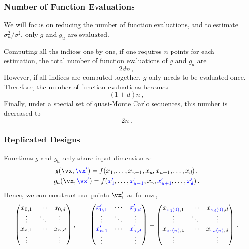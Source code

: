 \documentclass[11pt,compress]{beamer} %
\begin{document}
\begin{frame}
\frametitle{Number of Function Evaluations}
We will focus on reducing the number of function evaluations, and to estimate $\sigma_u^2/\sigma^2$, only $g$ and $g_u$ are evaluated.

Computing all the indices one by one, if one requires $n$ points for each estimation, the total number of function evaluations of $g$ and $g_u$ are
\[
2dn\, ,
\]
However, if all indices are computed together, $g$ only needs to be evaluated once. Therefore, the number of function evaluations becomes
\[
(1+d)n\, ,
\]
Finally, under a special set of quasi-Monte Carlo sequences, this number is decreased to
\[
2n\, .
\]
\end{frame}

\begin{frame}
\frametitle{Replicated Designs}
Functions $g$ and $g_u$ only share input dimension $u$:
\begin{gather*}
g(\vx,{\color{blue}\vx'})=f(x_1,\dots,x_{u-1},x_u,x_{u+1},\dots,x_d)\, ,\\
g_u(\vx,{\color{blue}\vx'})=f({\color{blue}x'_1},\dots,{\color{blue}x'_{u-1}},x_u,{\color{blue}x'_{u+1}},\dots,{\color{blue}x'_d})\, .
\end{gather*}
Hence, we can construct our points $\vx'_i$ as follows,
\begin{equation*}
\begin{pmatrix}
x_{0,1} & \cdots & x_{0,d} \\
\vdots & \ddots & \vdots \\
x_{n,1} & \cdots & x_{n,d} \\
\vdots &  & \vdots
\end{pmatrix},\qquad
\begin{pmatrix}
{\color{blue}x'_{0,1}} & \cdots & {\color{blue}x'_{0,d}} \\
\vdots & \ddots & \vdots \\
{\color{blue}x'_{n,1}} & \cdots & {\color{blue}x'_{n,d}} \\
\vdots &  & \vdots
\end{pmatrix}=
\begin{pmatrix}
x_{{\color{blue}\pi_1(0)},1} & \cdots & x_{{\color{blue}\pi_d(0)},d} \\
\vdots & \ddots & \vdots \\
x_{{\color{blue}\pi_1(n)},1} & \cdots & x_{{\color{blue}\pi_d(n)},d} \\
\vdots &  & \vdots \\
\end{pmatrix}\, .
\end{equation*}
\end{frame}
\end{document}
